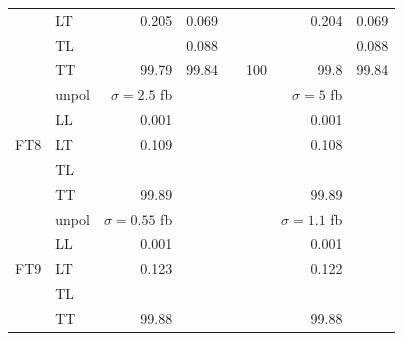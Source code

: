 \begin{table}[h]
{\begin{tabular}{llrrrrrr}
 & LT & \num{0.205} & \num{0.069} &  &  & \num{0.204} & \num{0.069} \\
 & TL &  & \num{0.088} &  &  &  & \num{0.088} \\
 & TT & \num{99.79} & \num{99.84} &  & \num{100} & \num{99.8} & \num{99.84} \\
\midrule
\multirow{5}{*}{FT8}
 & unpol & $\sigma = \num{2.5}$ fb &  &  &  & $\sigma = \num{5}$ fb &  \\
 & LL & \num{0.001} &  &  &  & \num{0.001} &  \\
 & LT & \num{0.109} &  &  &  & \num{0.108} &  \\
 & TL &  &  &  &  &  &  \\
 & TT & \num{99.89} &  &  &  & \num{99.89} &  \\
\midrule
\multirow{5}{*}{FT9}
 & unpol & $\sigma = \num{0.55}$ fb &  &  &  & $\sigma = \num{1.1}$ fb &  \\
 & LL & \num{0.001} &  &  &  & \num{0.001} &  \\
 & LT & \num{0.123} &  &  &  & \num{0.122} &  \\
 & TL &  &  &  &  &  &  \\
 & TT & \num{99.88} &  &  &  & \num{99.88} &  \\
\bottomrule
\end{tabular}
}%
\end{table}
\newpage
